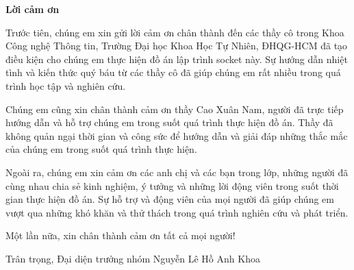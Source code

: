 \newpage
\vfill
\begin{center}
\textbf{\Large Lời cảm ơn}
\end{center}
\indent\hspace{0.6cm} Trước tiên, chúng em xin gửi lời cảm ơn chân thành đến các thầy cô trong Khoa Công nghệ Thông tin, Trường Đại học Khoa Học Tự Nhiên, ĐHQG-HCM đã tạo điều kiện cho chúng em thực hiện đồ án lập trình socket này. Sự hướng dẫn nhiệt tình và kiến thức quý báu từ các thầy cô đã giúp chúng em rất nhiều trong quá trình học tập và nghiên cứu.\newline

Chúng em cũng xin chân thành cảm ơn thầy Cao Xuân Nam, người đã trực tiếp hướng dẫn và hỗ trợ chúng em trong suốt quá trình thực hiện đồ án. Thầy đã không quản ngại thời gian và công sức để hướng dẫn và giải đáp những thắc mắc của chúng em trong suốt quá trình thực hiện.\newline

Ngoài ra, chúng em xin cảm ơn các anh chị và các bạn trong lớp, những người đã cùng nhau chia sẻ kinh nghiệm, ý tưởng và những lời động viên trong suốt thời gian thực hiện đồ án. Sự hỗ trợ và động viên của mọi người đã giúp chúng em vượt qua những khó khăn và thử thách trong quá trình nghiên cứu và phát triển.\newline

Một lần nữa, xin chân thành cảm ơn tất cả mọi người!\newline

\indent Trân trọng,\newline
\indent Đại diện trưởng nhóm\newline
\indent Nguyễn Lê Hồ Anh Khoa
\vfill

\newpage